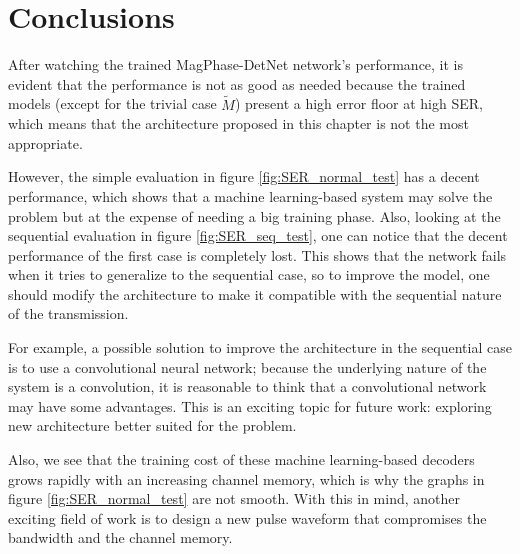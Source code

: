 \section{Conclusions}

After watching the trained MagPhase-DetNet network's performance, it is evident that the performance is not as good as needed because the trained models (except for the trivial case $\widetilde{M}$) present a high error floor at high SER, which means that the architecture proposed in this chapter is not the most appropriate.

However, the simple evaluation in figure \ref{fig:SER_normal_test} has a decent performance, which shows that a machine learning-based system may solve the problem but at the expense of needing a big training phase. Also, looking at the sequential evaluation in figure \ref{fig:SER_seq_test}, one can notice that the decent performance of the first case is completely lost. This shows that the network fails when it tries to generalize to the sequential case, so to improve the model, one should modify the architecture to make it compatible with the sequential nature of the transmission.

For example, a possible solution to improve the architecture in the sequential case is to use a convolutional neural network; because the underlying nature of the system is a convolution, it is reasonable to think that a convolutional network may have some advantages. This is an exciting topic for future work: exploring new architecture better suited for the problem.

Also, we see that the training cost of these machine learning-based decoders grows rapidly with an increasing channel memory, which is why the graphs in figure \ref{fig:SER_normal_test} are not smooth. With this in mind,  another exciting field of work is to design a new pulse waveform that compromises the bandwidth and the channel memory. 



















